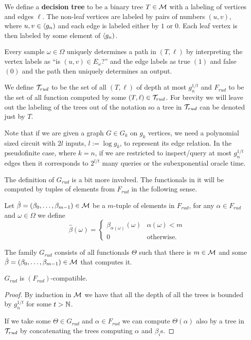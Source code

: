 \begin{defi}
We define a \textbf{decision tree} to be a binary tree $T\in\mathcal{M}$ with a labeling of vertices and edges $\ell$. The non-leaf vertices are labeled by pairs of numbers $(u,v)$, where $u,v\in\langle g_n)$ and each edge is labeled either by $1$ or $0$. Each leaf vertex is then labeled by some element of $\langle g_n)$.

Every sample $\omega\in\Omega$ uniquely determines a path in $(T,\ell)$ by interpreting the vertex labels as ``is $(u,v)\in E_\omega$?'' and the edge labels as true $(1)$ and false $(0)$ and the path then uniquely determines an output.

We define $\mathcal{T}_{rud}$ to be the set of all $(T,\ell)$ of depth at most $g_n^{1/t}$ and $F_{rud}$ to be the set of all function computed by some $(T,\ell)\in \mathcal{T}_{rud}$. For brevity we will leave out the labeling of the trees out of the notation so a tree in $\mathcal{T}_{rud}$ can be denoted just by $T$.
\end{defi}

Note that if we are given a graph $G\in G_k$ on $g_k$ vertices, we need a polynomial sized circuit with $2l$ inputs, $l:=\log g_k$, to represent its edge relation. In the pseudofinite case, where $k=n$, if we are restricted to inspect/query at most $g_n^{1/t}$ edges then it corresponds to $2^{l/t}$ many queries or the subexponential oracle time.

The definition of $G_{rud}$ is a bit more involved. The functionals in it will be computed by tuples of elements from $F_{rud}$ in the following sense.

\begin{defi}
Let $\hat\beta=(\beta_0,\dots,\beta_{m-1})\in\mathcal{M}$ be a $m$-tuple of elements in $F_{rud}$, for any $\alpha\in F_{rud}$ and $\omega\in\Omega$ we define
\[\hat\beta(\omega)=
\begin{cases}
\beta_{\alpha(\omega)}(\omega)&\alpha(\omega)<m\\
0&\text{otherwise.}
\end{cases}\]
\end{defi}

\begin{defi}
The family $G_{rud}$ consists of all functionals $\Theta$ such that there is $m\in\mathcal{M}$ and some $\hat \beta=(\beta_0,\dots,\beta_{m-1})\in\mathcal{M}$ that computes it.
\end{defi}

\begin{lemm}
$G_{rud}$ is $(F_{rud})$-compatible.
\end{lemm}
\begin{proof}
By induction in $\mathcal{M}$ we have that all the depth of all the trees is bounded by $g_n^{1/t}$ for some $t>\mathbb{N}$.

If we take some $\Theta\in G_{rud}$ and $\alpha\in F_{rud}$ we can compute $\Theta(\alpha)$ also by a tree in $\mathcal{T}_{rud}$ by concatenating the trees computing $\alpha$ and $\beta_i$s.
\end{proof}

